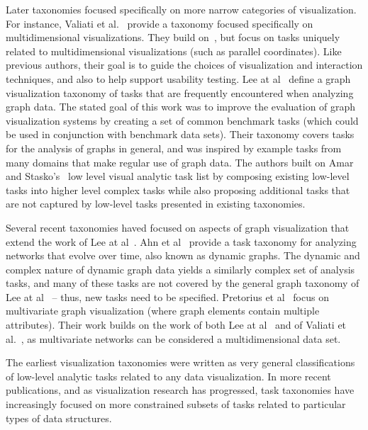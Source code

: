 \documentclass{egpubl}
\begin{document}
Later taxonomies focused specifically on more narrow categories of visualization.
For instance, Valiati et al.~\cite{Valiati2006} provide a taxonomy focused specifically on multidimensional visualizations. They build on~\cite{Wehrend1990}, but focus on tasks uniquely related to multidimensional visualizations (such as parallel coordinates).
Like previous authors, their goal is to guide the choices of visualization and interaction techniques, and also to  help support usability testing.
Lee at al~\cite{Lee2006} define a graph visualization taxonomy of tasks that are frequently encountered when analyzing graph data.
The stated goal of this work was to improve the evaluation of graph visualization systems by creating a set of common benchmark tasks (which could be used in conjunction with benchmark data sets).
Their taxonomy covers tasks for the analysis of graphs in general, and was inspired by example tasks from many domains that make regular use of graph data.
The authors built on Amar and Stasko's~\cite{Amar2005} low level visual analytic task list by composing existing low-level tasks into higher level complex tasks while also proposing additional tasks that are not captured by low-level tasks presented in existing taxonomies.



Several recent taxonomies haved focused on aspects of graph visualization that extend the work of Lee at al~\cite{Lee2006}.
Ahn et al~\cite{Ahn2014} provide a task taxonomy for analyzing networks that evolve over time, also known as dynamic graphs.
The dynamic and complex nature of dynamic graph data yields a similarly complex set of analysis tasks, and many of these tasks are not covered by the general graph taxonomy of Lee at al~\cite{Lee2006} -- thus, new tasks need to be specified.
Pretorius et al~\cite{Pretorius2014} focus on multivariate graph visualization (where graph elements contain multiple attributes).
Their work builds on the work of both Lee at al~\cite{Lee2006} and of Valiati et al.~\cite{Valiati2006}, as multivariate networks can be considered a multidimensional data set.

The earliest visualization taxonomies were written as very general classifications of low-level analytic tasks related to any data visualization. In more recent publications, and as visualization research has progressed, task taxonomies have increasingly focused on more constrained subsets of tasks related to particular types of data structures.
\end{document}
